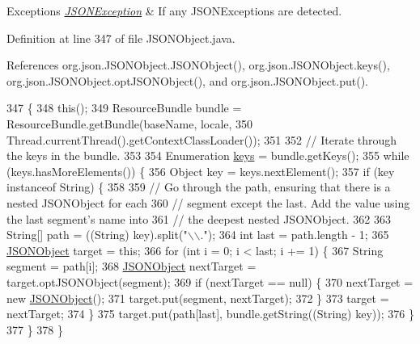\begin{DoxyExceptions}{Exceptions}
{\em \hyperlink{classorg_1_1json_1_1_j_s_o_n_exception}{J\-S\-O\-N\-Exception}} & If any J\-S\-O\-N\-Exceptions are detected. \\
\hline
\end{DoxyExceptions}


Definition at line 347 of file J\-S\-O\-N\-Object.\-java.



References org.\-json.\-J\-S\-O\-N\-Object.\-J\-S\-O\-N\-Object(), org.\-json.\-J\-S\-O\-N\-Object.\-keys(), org.\-json.\-J\-S\-O\-N\-Object.\-opt\-J\-S\-O\-N\-Object(), and org.\-json.\-J\-S\-O\-N\-Object.\-put().


\begin{DoxyCode}
347                                                                            \{
348         \textcolor{keyword}{this}();
349         ResourceBundle bundle = ResourceBundle.getBundle(baseName, locale,
350                 Thread.currentThread().getContextClassLoader());
351 
352 \textcolor{comment}{// Iterate through the keys in the bundle.}
353 
354         Enumeration \hyperlink{classorg_1_1json_1_1_j_s_o_n_object_a1909c454712287d3a7c988beaa0613ff}{keys} = bundle.getKeys();
355         \textcolor{keywordflow}{while} (keys.hasMoreElements()) \{
356             Object key = keys.nextElement();
357             \textcolor{keywordflow}{if} (key instanceof String) \{
358 
359 \textcolor{comment}{// Go through the path, ensuring that there is a nested JSONObject for each}
360 \textcolor{comment}{// segment except the last. Add the value using the last segment's name into}
361 \textcolor{comment}{// the deepest nested JSONObject.}
362 
363                 String[] path = ((String) key).split(\textcolor{stringliteral}{"\(\backslash\)\(\backslash\)."});
364                 \textcolor{keywordtype}{int} last = path.length - 1;
365                 \hyperlink{classorg_1_1json_1_1_j_s_o_n_object_a7c17e59daff74ce50c6677c6f5da233d}{JSONObject} target = \textcolor{keyword}{this};
366                 \textcolor{keywordflow}{for} (\textcolor{keywordtype}{int} i = 0; i < last; i += 1) \{
367                     String segment = path[i];
368                     \hyperlink{classorg_1_1json_1_1_j_s_o_n_object_a7c17e59daff74ce50c6677c6f5da233d}{JSONObject} nextTarget = target.optJSONObject(segment);
369                     \textcolor{keywordflow}{if} (nextTarget == null) \{
370                         nextTarget = \textcolor{keyword}{new} \hyperlink{classorg_1_1json_1_1_j_s_o_n_object_a7c17e59daff74ce50c6677c6f5da233d}{JSONObject}();
371                         target.put(segment, nextTarget);
372                     \}
373                     target = nextTarget;
374                 \}
375                 target.put(path[last], bundle.getString((String) key));
376             \}
377         \}
378     \}
\end{DoxyCode}


